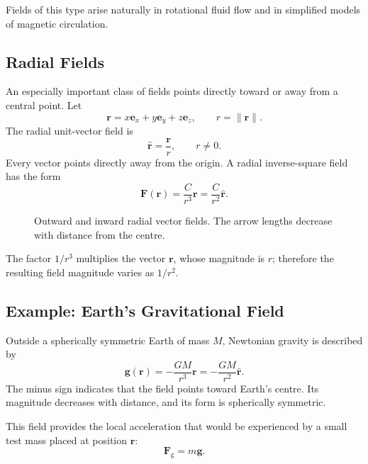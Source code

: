 Fields of this type arise naturally in rotational fluid flow and in simplified
models of magnetic circulation.

\subsection{Radial Fields}

An especially important class of fields points directly toward or away from a
central point. Let
\[
\mathbf r=x\mathbf e_x+y\mathbf e_y+z\mathbf e_z,
\qquad
r=\lVert\mathbf r\rVert.
\]
The radial unit-vector field is
\[
\widehat{\mathbf r}=\frac{\mathbf r}{r},
\qquad r\neq 0.
\]
Every vector points directly away from the origin. A radial inverse-square field
has the form
\[
\boxed{
\mathbf F(\mathbf r)
=
\frac{C}{r^3}\mathbf r
=
\frac{C}{r^2}\widehat{\mathbf r}.
}
\]

\begin{figure}[htbp]
\centering
\begingroup
{}

\endgroup
\caption{Outward and inward radial vector fields. The arrow lengths decrease
with distance from the centre.}
\label{fig:radial-vector-fields}
\end{figure}

The factor $1/r^3$ multiplies the vector $\mathbf r$, whose magnitude is $r$;
therefore the resulting field magnitude varies as $1/r^2$.

\subsection{Example: Earth's Gravitational Field}

Outside a spherically symmetric Earth of mass $M$, Newtonian gravity is
described by
\[
\boxed{
\mathbf g(\mathbf r)
=
-\frac{GM}{r^3}\mathbf r
=
-\frac{GM}{r^2}\widehat{\mathbf r}.
}
\]
The minus sign indicates that the field points toward Earth's centre. Its
magnitude decreases with distance, and its form is spherically symmetric.

This field provides the local acceleration that would be experienced by a small
test mass placed at position $\mathbf r$:
\[
\mathbf F_{\mathrm g}=m\mathbf g.
\]


